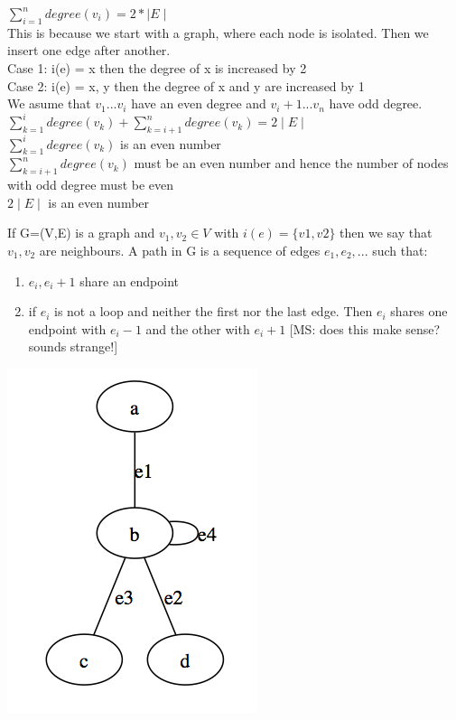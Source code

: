 \begin{prooof}
    $\sum\limits_{i=1}^n degree(v{_i}) = 2* \mid E \mid$ \\
This is because we start with a graph, where each node is isolated. Then we insert one edge after another.\\
Case 1: i(e) = {x} then the degree of x is increased by 2\\
Case 2: i(e) = {x, y} then the degree of x and y are increased by 1\\
We asume that $v{_1}...v{_i}$ have an even degree and $v{_i+1}...v{_n}$ have odd degree.\\

$\sum\limits_{k=1}^i degree(v{_k}) + \sum\limits_{k=i+1}^n degree(v{_k}) = 2 \mid E \mid$\\

$\sum\limits_{k=1}^i degree(v{_k})$ is an even number\\

$\sum\limits_{k=i+1}^n degree(v{_k})$ must be an even number and hence the number of nodes with odd degree must be even\\

$ 2 \mid E \mid$ is an even number \\

\end{prooof}


\begin{definition}
    If G=(V,E) is a graph and $v{_1}, v{_2} \in V$ with $i(e) = \{v1, v2\}$ then we say that $v{_1}, v{_2}$ are neighbours. A path in G is a sequence of edges $e{_1}, e{_2}, ...$ such that: \\
\begin{enumerate}
\item $e{_i}, e{_i+1}$ share an endpoint
\item if $e{_i}$ is not a loop and neither the first nor the last edge. Then $e{_i}$ shares one endpoint with $e{_i-1}$ and the other with $e{_i+1}$ [MS: does this make sense? sounds strange!]
\end{enumerate}
\end{definition}

\begin{example*}
\includegraphics[scale=0.5]{diagrams/Chapter1_Example2}
\end{example*}

